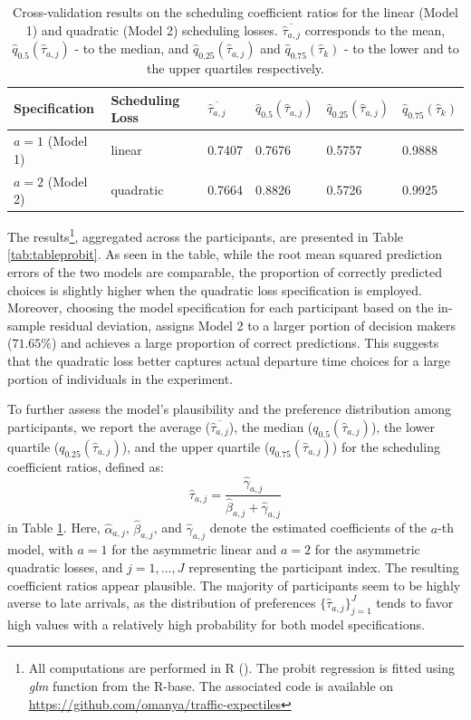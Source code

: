 \documentclass[preprint, 3p, authoryear]{elsarticle} %
\theoremstyle{definition}
\theoremstyle{definition}
\theoremstyle{definition}
\theoremstyle{definition}
\theoremstyle{remark}
\begin{document}
\begin{table}
\centering
\caption{\label{tab:tabprobitres}Cross-validation results on the scheduling coefficient ratios for the linear (Model 1) and quadratic (Model 2) scheduling losses. $\overline{\hat \tau_{a,j}}$ corresponds to the mean, $\hat q_{0.5}({\hat \tau_{a,j} })$ - to the median, and $\hat q_{0.25}({\hat \tau_{a,j} })$ and $\hat q_{0.75}({\hat \tau_{k} })$ - to the lower and to the upper quartiles respectively.}
\centering
\begin{tabular}[t]{l|l|l|l|l|l}
\hline
Specification & Scheduling Loss & $\overline{\hat \tau_{a,j}}$ & $\hat q_{0.5}({\hat \tau_{a,j} })$ & $\hat q_{0.25}({\hat \tau_{a,j} })$ & $\hat q_{0.75}({\hat \tau_{k} })$\\
\hline
$a=1$ (Model 1) & linear & 0.7407 & 0.7676 & 0.5757 & 0.9888\\
\hline
$a=2$ (Model 2) & quadratic & 0.7664 & 0.8826 & 0.5726 & 0.9925\\
\hline
\end{tabular}
\end{table}

The results\footnote{All computations are performed in R (\citet{rr}). The probit regression is fitted using \emph{glm} function from the R-base. The associated code is available on \url{https://github.com/omanya/traffic-expectiles}}, aggregated across the participants, are presented in Table \ref{tab:tableprobit}. As seen in the table, while the root mean squared prediction errors of the two models are comparable, the proportion of correctly predicted choices is slightly higher when the quadratic loss specification is employed. Moreover, choosing the model specification for each participant based on the in-sample residual deviation, assigns Model 2 to a larger portion of decision makers (\(71.65\%\)) and achieves a large proportion of correct predictions. This suggests that the quadratic loss better captures actual departure time choices for a large portion of individuals in the experiment.

To further assess the model's plausibility and the preference distribution among participants, we report the average (\(\overline{\hat \tau_{a,j} }\)), the median (\(q_{0.5}({\hat \tau_{a,j} })\)), the lower quartile (\(q_{0.25}({\hat \tau_{a,j} })\)), and the upper quartile (\(q_{0.75}({\hat \tau_{a,j} })\)) for the scheduling coefficient ratios, defined as:
\[\hat \tau_{a,j} = \frac{\hat\gamma_{a,j}}{\hat\beta_{a,j}+\hat\gamma_{a,j}}\]
in Table \ref{tab:tabprobitres}. Here, \(\hat\alpha_{a,j}\), \(\hat\beta_{a,j}\), and \(\hat\gamma_{a,j}\) denote the estimated coefficients of the \(a\)-th model, with \(a=1\) for the asymmetric linear and \(a=2\) for the asymmetric quadratic losses, and \(j=1,\ldots,J\) representing the participant index. The resulting coefficient ratios appear plausible. The majority of participants seem to be highly averse to late arrivals, as the distribution of preferences \(\{\hat\tau_{a,j}\}_{j=1}^J\) tends to favor high values with a relatively high probability for both model specifications.
\end{document}
